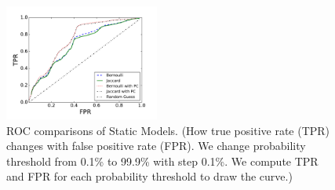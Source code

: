 \begin{figure}[t!]
\begin{center}
\includegraphics[width=2in]{figure/predict}
\caption{ROC comparisons of Static Models. 
(How true positive rate (TPR) changes with false positive rate (FPR). 
We change probability threshold from 0.1\% to 99.9\% with step 0.1\%. 
We compute TPR and FPR for each probability threshold to draw the curve.)
}
\label{fig:predict}
\end{center}
\end{figure}